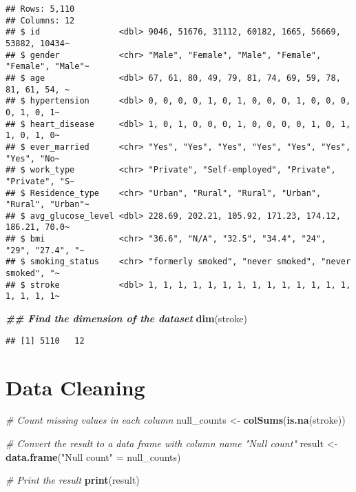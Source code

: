 \documentclass[
]{article}
\newenvironment{Shaded}{\begin{snugshade}}{\end{snugshade}}
\newcommand{\CommentTok}[1]{\textcolor[rgb]{0.56,0.35,0.01}{\textit{#1}}}
\newcommand{\DocumentationTok}[1]{\textcolor[rgb]{0.56,0.35,0.01}{\textbf{\textit{#1}}}}
\newcommand{\FunctionTok}[1]{\textcolor[rgb]{0.13,0.29,0.53}{\textbf{#1}}}
\newcommand{\NormalTok}[1]{#1}
\newcommand{\OtherTok}[1]{\textcolor[rgb]{0.56,0.35,0.01}{#1}}
\newcommand{\StringTok}[1]{\textcolor[rgb]{0.31,0.60,0.02}{#1}}
\begin{document}
\begin{verbatim}
## Rows: 5,110
## Columns: 12
## $ id                <dbl> 9046, 51676, 31112, 60182, 1665, 56669, 53882, 10434~
## $ gender            <chr> "Male", "Female", "Male", "Female", "Female", "Male"~
## $ age               <dbl> 67, 61, 80, 49, 79, 81, 74, 69, 59, 78, 81, 61, 54, ~
## $ hypertension      <dbl> 0, 0, 0, 0, 1, 0, 1, 0, 0, 0, 1, 0, 0, 0, 0, 1, 0, 1~
## $ heart_disease     <dbl> 1, 0, 1, 0, 0, 0, 1, 0, 0, 0, 0, 1, 0, 1, 1, 0, 1, 0~
## $ ever_married      <chr> "Yes", "Yes", "Yes", "Yes", "Yes", "Yes", "Yes", "No~
## $ work_type         <chr> "Private", "Self-employed", "Private", "Private", "S~
## $ Residence_type    <chr> "Urban", "Rural", "Rural", "Urban", "Rural", "Urban"~
## $ avg_glucose_level <dbl> 228.69, 202.21, 105.92, 171.23, 174.12, 186.21, 70.0~
## $ bmi               <chr> "36.6", "N/A", "32.5", "34.4", "24", "29", "27.4", "~
## $ smoking_status    <chr> "formerly smoked", "never smoked", "never smoked", "~
## $ stroke            <dbl> 1, 1, 1, 1, 1, 1, 1, 1, 1, 1, 1, 1, 1, 1, 1, 1, 1, 1~
\end{verbatim}

\begin{Shaded}
\begin{Highlighting}[]
\DocumentationTok{\#\# Find the dimension of the dataset}
\FunctionTok{dim}\NormalTok{(stroke)}
\end{Highlighting}
\end{Shaded}

\begin{verbatim}
## [1] 5110   12
\end{verbatim}

\hypertarget{data-cleaning}{%
\section{Data Cleaning}\label{data-cleaning}}

\begin{Shaded}
\begin{Highlighting}[]
\CommentTok{\# Count missing values in each column}
\NormalTok{null\_counts }\OtherTok{\textless{}{-}} \FunctionTok{colSums}\NormalTok{(}\FunctionTok{is.na}\NormalTok{(stroke))}

\CommentTok{\# Convert the result to a data frame with column name "Null count"}
\NormalTok{result }\OtherTok{\textless{}{-}} \FunctionTok{data.frame}\NormalTok{(}\StringTok{"Null count"} \OtherTok{=}\NormalTok{ null\_counts)}

\CommentTok{\# Print the result}
\FunctionTok{print}\NormalTok{(result)}
\end{Highlighting}
\end{Shaded}
\end{document}
